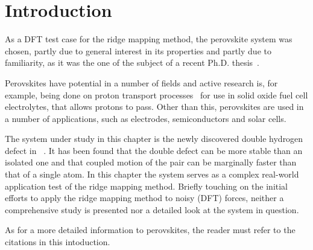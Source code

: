 \section{Introduction}
\label{sec:perovskites-introduction}

As a DFT test case for the ridge mapping method, the  perovskite system was chosen, partly due to general interest in its properties and partly due to familiarity, as it was the one of the subject of a recent Ph.D. thesis~\cite{nicolai-2010}.

Perovskites have potential in a number of fields and active research is, for example, being done on proton transport processes~\cite{perovskites-hydrogen-diffusion-2007, perovskites-proton-transport-2008} for use in solid oxide fuel cell electrolytes, that allows protons to pass\cite{perovskites-in-fuel-cells-1981}.
Other than this, perovskites are used in a number of applications, such as electrodes, semiconductors and solar cells.

The system under study in this chapter is the newly discovered double hydrogen defect in ~\cite{double-defect-2011}.
It has been found that the double defect can be more stable than an isolated one and that coupled motion of the pair can be marginally faster than that of a single atom.
In this chapter the system serves as a complex real-world application test of the ridge mapping method.
Briefly touching on the initial efforts to apply the ridge mapping method to noisy (DFT) forces, neither a comprehensive study is presented nor a detailed look at the system in question.

As for a more detailed information to perovskites, the reader must refer to the citations in this intoduction.





